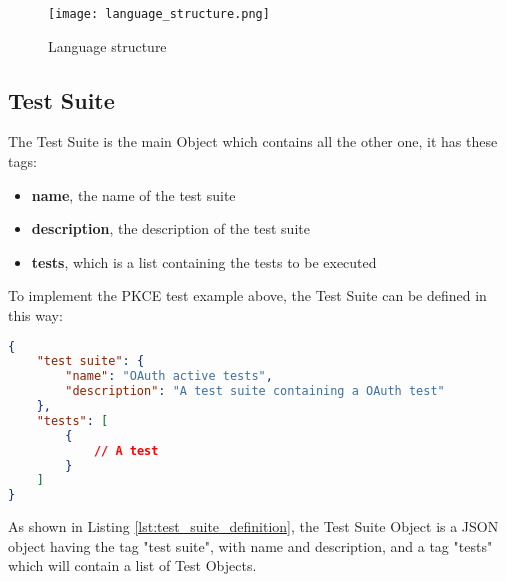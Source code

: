 \begin{figure}
    \texttt{[image: language\_structure.png]}
    \caption{Language structure}
    \label{fig:language_structure}
\end{figure}

\subsection{Test Suite}
The Test Suite is the main Object which contains all the other one, it has these tags:

\begin{itemize}
    \item \textbf{name}, the name of the test suite
    \item \textbf{description}, the description of the test suite
    \item \textbf{tests}, which is a list containing the tests to be executed
\end{itemize}
To implement the PKCE test example above, the Test Suite can be defined in this way:

\begin{lstlisting}[language=json, caption=Test Suite definition, label={lst:test_suite_definition}]
{
    "test suite": {
        "name": "OAuth active tests",
        "description": "A test suite containing a OAuth test"
    },
    "tests": [
        {
            // A test
        }
    ]
}
\end{lstlisting}

As shown in Listing \ref{lst:test_suite_definition}, the Test Suite Object is a JSON object having the tag "test suite", with name and description, and a tag "tests" which will contain a list of Test Objects.

